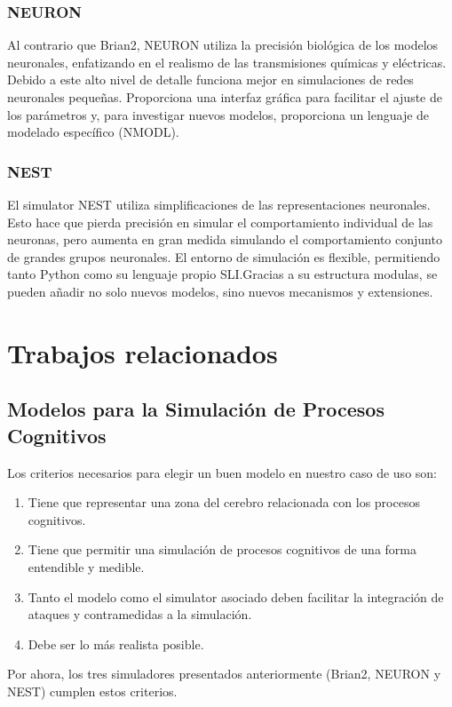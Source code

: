\documentclass[12pt, letterpaper]{article}
\begin{document}
\subsubsection{NEURON}
Al contrario que Brian2, NEURON utiliza la precisión biológica de los modelos neuronales, enfatizando en el realismo de las transmisiones químicas y eléctricas. Debido a este alto nivel de detalle funciona mejor en simulaciones de redes neuronales pequeñas. Proporciona una interfaz gráfica para facilitar el ajuste de los parámetros y, para investigar nuevos modelos, proporciona un lenguaje de modelado específico (NMODL).

\subsubsection{NEST}
El simulator NEST utiliza simplificaciones de las representaciones neuronales. Esto hace que pierda precisión en simular el comportamiento individual de las neuronas, pero aumenta en gran medida simulando el comportamiento conjunto de grandes grupos neuronales. El entorno de simulación es flexible, permitiendo tanto Python como su lenguaje propio SLI.\@ Gracias a su estructura modulas, se pueden añadir no solo nuevos modelos, sino nuevos mecanismos y extensiones.


\section{Trabajos relacionados}

\subsection{Modelos para la Simulación de Procesos Cognitivos}
Los criterios necesarios para elegir un buen modelo en nuestro caso de uso son:
\begin{enumerate}
    \item Tiene que representar una zona del cerebro relacionada con los procesos cognitivos.
    \item Tiene que permitir una simulación de procesos cognitivos de una forma entendible y medible.
    \item Tanto el modelo como el simulator asociado deben facilitar la integración de ataques y contramedidas a la simulación.
    \item Debe ser lo más realista posible.
\end{enumerate}

Por ahora, los tres simuladores presentados anteriormente (Brian2, NEURON y NEST) cumplen estos criterios.
\end{document}
